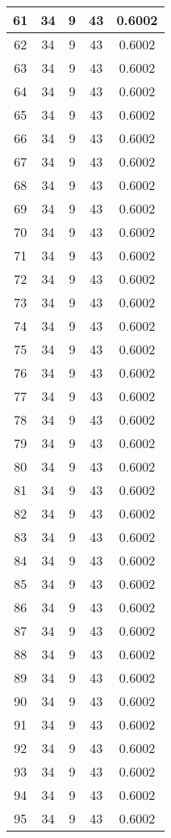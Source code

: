 \documentclass[letterpaper, 12pt]{article}
\begin{document}
\begin{longtable}{|c|c|c|c|c|}
\hline
61 & 34 & 9 & 43 & 0.6002 \\
\hline
62 & 34 & 9 & 43 & 0.6002 \\
\hline
63 & 34 & 9 & 43 & 0.6002 \\
\hline
64 & 34 & 9 & 43 & 0.6002 \\
\hline
65 & 34 & 9 & 43 & 0.6002 \\
\hline
66 & 34 & 9 & 43 & 0.6002 \\
\hline
67 & 34 & 9 & 43 & 0.6002 \\
\hline
68 & 34 & 9 & 43 & 0.6002 \\
\hline
69 & 34 & 9 & 43 & 0.6002 \\
\hline
70 & 34 & 9 & 43 & 0.6002 \\
\hline
71 & 34 & 9 & 43 & 0.6002 \\
\hline
72 & 34 & 9 & 43 & 0.6002 \\
\hline
73 & 34 & 9 & 43 & 0.6002 \\
\hline
74 & 34 & 9 & 43 & 0.6002 \\
\hline
75 & 34 & 9 & 43 & 0.6002 \\
\hline
76 & 34 & 9 & 43 & 0.6002 \\
\hline
77 & 34 & 9 & 43 & 0.6002 \\
\hline
78 & 34 & 9 & 43 & 0.6002 \\
\hline
79 & 34 & 9 & 43 & 0.6002 \\
\hline
80 & 34 & 9 & 43 & 0.6002 \\
\hline
81 & 34 & 9 & 43 & 0.6002 \\
\hline
82 & 34 & 9 & 43 & 0.6002 \\
\hline
83 & 34 & 9 & 43 & 0.6002 \\
\hline
84 & 34 & 9 & 43 & 0.6002 \\
\hline
85 & 34 & 9 & 43 & 0.6002 \\
\hline
86 & 34 & 9 & 43 & 0.6002 \\
\hline
87 & 34 & 9 & 43 & 0.6002 \\
\hline
88 & 34 & 9 & 43 & 0.6002 \\
\hline
89 & 34 & 9 & 43 & 0.6002 \\
\hline
90 & 34 & 9 & 43 & 0.6002 \\
\hline
91 & 34 & 9 & 43 & 0.6002 \\
\hline
92 & 34 & 9 & 43 & 0.6002 \\
\hline
93 & 34 & 9 & 43 & 0.6002 \\
\hline
94 & 34 & 9 & 43 & 0.6002 \\
\hline
95 & 34 & 9 & 43 & 0.6002 \\

\end{longtable}
\end{document}
